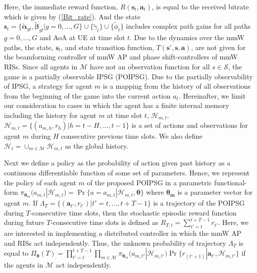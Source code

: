 \documentclass[conference]{IEEEtran}
\begin{document}
Here, the immediate reward function, $R(\boldsymbol{s}_t, \boldsymbol{a}_t)$, is equal to the received bitrate which is given by (\ref{Bit_rate}). And the state $\boldsymbol{s}_t=\{\tilde{\boldsymbol{\alpha}}_{gt},\tilde{\boldsymbol{\beta}}_{gt}|g=0,...,G\}\cup\{\tilde{\gamma}_t\}\cup\{\tilde{\phi}_{t}\}$ includes complex path gains for all paths $g=0,...,G$ and AoA at UE at time slot $t$. Due to the dynamics over the mmW paths, the state, $\boldsymbol{s}_t$, and state transition function, $T(\boldsymbol{s}',\boldsymbol{s},\boldsymbol{a})$, are not given for the beamforming controller of mmW AP and phase shift-controllers of mmW RISs. Since all agents in $\mathcal{M}$ have not an observation function for all $s\in \mathcal{S}$, the game is a partially observable IPSG (POIPSG). Due to the partially observability of IPSG, a strategy for  agent $m$ is a mapping from the history of all observations from the beginning of the game into the current action $a_t$. Hereinafter, we limit our consideration to cases in which the agent has a finite internal memory including the history for agent $m$ at time slot $t$, $\mathcal{H}_{m,t}$. $\mathcal{H}_{m,t}=\{(a_{m,h},r_h)|h=t-H,...,t-1\}$ is a set of actions and observations for agent $m$ during $H$ consecutive previous time slots. We also define $\mathcal{H}_{t}=\cup_{m \in \mathcal{M}}\mathcal{H}_{m,t}$ as the global history.

Next we define a policy as the probability of action given past history as a continuous differentiable function of some set of parameters. Hence, we represent the policy of each agent $m$ of the proposed POIPSG in a parametric functional-form $\pi_{\boldsymbol{\theta}_m}(a_{m,t}|\mathcal{H}_{m,t})=\Pr\{a=a_{m,t}| \mathcal{H}_{m,t},\boldsymbol{\theta}\}$ where $\boldsymbol{\theta_m}$ is a parameter vector for agent $m$. If $\Lambda_{T}=\{(\boldsymbol{a}_{t'},r_{t'})|t'=t,...,t+T-1\}$ is a trajectory of the POIPSG during $T$-consecutive time slots, then the stochastic episodic reward function during future $T$-consecutive time slots is defined as $R_{T,t}=\sum_{t'=t}^{t+T-1}r_{t'}$. Here, we are interested in implementing a distributed controller in which the mmW AP and RISs act independently. Thus, the unknown probability of trajectory $\Lambda_{T}$ is equal to $\Pi_{\boldsymbol{\theta}}(T)=\prod_{t'=t}^{t+T-1} \prod_{m\in \mathcal{M}} \pi_{\boldsymbol{\theta}_m}(a_{m,t'}|\mathcal{H}_{m,t'}) \Pr\{r_{(t'+1)}|\boldsymbol{a}_{t'},\mathcal{H}_{m,t'}\}$ if the agents in $\mathcal{M}$ act independently.
\end{document}
